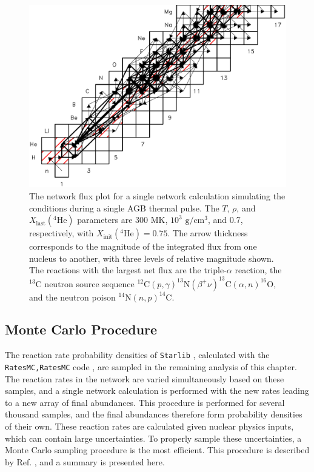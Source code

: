 \begin{figure}[t]
\centering
\includegraphics[width=6.5in]{Chapter-3/figs/Flux.png}
\caption{\label{fig:Flux}The network flux plot for a single network calculation simulating the conditions during a single AGB thermal pulse. The $T$, $\rho$, and $X_{\mathrm{last}}(^{4}\mathrm{He})$ parameters are 300 MK, $10^{3}$ $\mathrm{g}/\mathrm{cm}^{3}$, and 0.7, respectively, with $X_{\mathrm{init}}(^{4}\mathrm{He}) = 0.75$. The arrow thickness corresponds to the magnitude of the integrated flux from one nucleus to another, with three levels of relative magnitude shown. The reactions with the largest net flux are the triple-$\alpha$ reaction, the $^{13}$C neutron source sequence $^{12}\mathrm{C}(p,\gamma)^{13}\mathrm{N}(\beta^{+}\nu)^{13}\mathrm{C}(\alpha,n)^{16}\mathrm{O}$, and the neutron poison $^{14}\mathrm{N}(n,p)^{14}\mathrm{C}$.}
\end{figure}

\subsection{Monte Carlo Procedure}



The reaction rate probability densities of \texttt{Starlib} \cite{Sallaska2013}, calculated with the \texttt{RatesMC,RatesMC} code \cite{Longland2010a}, are sampled in the remaining analysis of this chapter. The reaction rates in the network are varied simultaneously based on these samples, and a single network calculation is performed with the new rates leading to a new array of final abundances. This procedure is performed for several thousand samples, and the final abundances therefore form probability densities of their own. These reaction rates are calculated given nuclear physics inputs, which can contain large uncertainties. To properly sample these uncertainties, a Monte Carlo sampling procedure is the most efficient. This procedure is described by Ref. \cite{Longland2012}, and a summary is presented here. 

